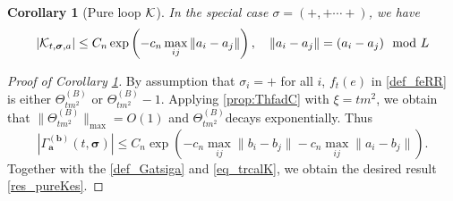 \documentclass[10pt,reqno]{article}
\theoremstyle{plain} %
\newtheorem{corollary}[theorem]{Corollary}
\theoremstyle{remark}
\numberwithin{equation}{section}
\begin{document}
\begin{corollary}[Pure loop $\cal K$]\label{lem_pureloop} In the special case %
$\sigma=(+,+\cdots +)$, we have 
\begin{align}\label{res_pureKes}\left|{\cal K}_{t, \boldsymbol{\sigma}, \textbf{a}}\right|\le C_n \exp\left(-c_n\max_{ij}\|a_i-a_j\|\right),\quad \|a_i-a_j\|=(a_i-a_j) \mod L
\end{align} 
\end{corollary}
\begin{proof}[Proof of Corollary \ref{lem_pureloop}]
By  assumption that  $\sigma_i=+$ for all $i$,   $f_t(e)$ in \eqref{def_feRR} is either  $\Theta^{(B)}_{tm^2}$ or $\Theta^{(B)}_{tm^2}-1$. Applying  \eqref{prop:ThfadC} with $\xi=tm^2$, we obtain that $\|\Theta^{(B)}_{tm^2}\|_{\max}=O(1)$ and $\Theta^{(B)}_{tm^2}$decays exponentially. Thus 
$$  \left|\Gamma^{(\textbf{b})}_{\textbf{a}}(t, \boldsymbol{\sigma})\right|\le C_n \exp\left(-c_n\max_{ij}\|b_i-b_j\|-c_n \max_{ij}\|a_i-b_j\|\right).
 $$
Together with the \eqref{def_Gatsiga} and \eqref{eq_trcalK}, we obtain the desired result \eqref{res_pureKes}. 
\end{proof}
\end{document}
